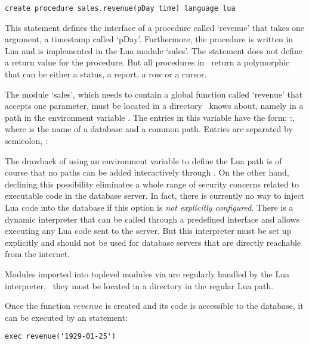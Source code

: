 \begin{sqlcode}
\begin{lstlisting}
create procedure sales.revenue(pDay time) language lua 
\end{lstlisting}
\end{sqlcode}

This statement defines the interface of a procedure
called `revenue' that takes one argument, a timestamp
called `pDay'.
Furthermore, the procedure is written in Lua and
is implemented in the Lua module `sales'.
The statement does not define a return value for the procedure.
But all procedures in \nowdb\ return a
polymorphic  that
can be either a status, a report, a row or a cursor.

The  module `sales',
which needs to contain a global function called `revenue'
that accepts one parameter,
must be located in a directory
\nowdb\ knows about, namely 
in a path in the environment variable
.
The entries in this variable have the form:
:,
where  is the name of a database
and  a common  path.
Entries are separated by semicolon, \eg:


The drawback of using an environment variable
to define the Lua path is of course that no paths
can be added interactively through .
On the other hand, declining this possibility 
eliminates a whole range of security concerns related
to executable code in the database server.
In fact, there is currently no way to inject
Lua code into the database
if this option is 
\emph{not explicitly configured}.
There is a dynamic interpreter that can
be called through a predefined interface
and allows executing any Lua code sent
to the server. But this interpreter
must be set up explicitly and should not
be used for database servers that are
directly reachable from the internet.

Modules imported into toplevel modules via 
are regularly handled by the Lua interpreter, \ie\
they must be located in a directory in the regular
Lua path.

Once the function $revenue$ is created
and its code is accessible to the database, it
can be executed by an  statement:

\begin{sqlcode}
\begin{lstlisting}
exec revenue('1929-01-25')
\end{lstlisting}
\end{sqlcode}

